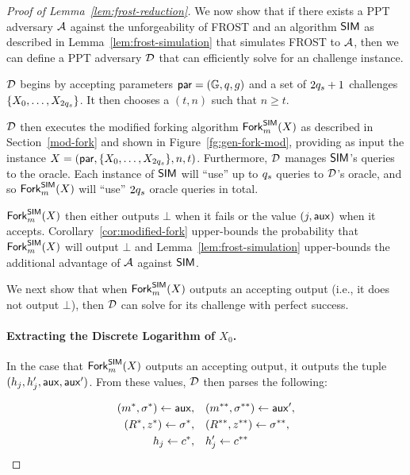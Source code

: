 \begin{proof}[Proof of Lemma~\ref{lem:frost-reduction}]
  We now show that if there exists a PPT adversary $\mathcal{A}$ against the
  unforgeability of FROST and an algorithm $\mathsf{SIM}$
  as described in Lemma~\ref{lem:frost-simulation} that simulates FROST to $\mathcal{A}$,
  then we can define a PPT adversary $\mathcal{D}$ that can efficiently solve for an \AOMDL challenge instance.

  $\mathcal{D}$ begins by accepting parameters $\mathsf{par} = (\mathbb{G}, q, g)$ and a set  of $2q_s+1$ \AOMDL challenges
  $\{ X_0, \ldots, X_{2q_s}\}$.
  It then chooses a $(t, n)$ such that $n \geq t$.

  $\mathcal{D}$ then executes the modified forking algorithm $\mathsf{Fork}_m^{\mathsf{SIM}}(X)$ as described in Section~\ref{mod-fork} and shown in Figure~\ref{fg:gen-fork-mod},
  providing as input the instance $X = (\mathsf{par}, \{ X_0, \ldots, X_{2q_s}\}, n, t)$.
  Furthermore, $\mathcal{D}$ manages $\mathsf{SIM}$'s queries to the \AOMDL oracle.
  Each instance of $\mathsf{SIM}$ will ``use'' up to $q_s$ queries to $\mathcal{D}$'s \AOMDL oracle,
  and so $\mathsf{Fork}_m^{\mathsf{SIM}}(X)$ will ``use'' $2q_s$ \AOMDL oracle queries in total.

  $\mathsf{Fork}_m^{\mathsf{SIM}}(X)$ then either outputs $\bot$ when it fails or the value $(j, \mathsf{aux})$ when it accepts.
  Corollary~\ref{cor:modified-fork} upper-bounds the probability that $\mathsf{Fork}_m^{\mathsf{SIM}}(X)$ will output $\bot$
  and Lemma~\ref{lem:frost-simulation} upper-bounds the additional advantage of $\mathcal{A}$ against $\mathsf{SIM}$.

   We next show that when $\mathsf{Fork}_m^{\mathsf{SIM}}(X)$ outputs an accepting output
   (i.e., it does not output $\bot$),
   then $\mathcal{D}$ can solve for its \AOMDL challenge with perfect success.

 \paragraph{Extracting the Discrete Logarithm of $X_0$.}
   In the case that $\mathsf{Fork}_m^{\mathsf{SIM}}(X)$ outputs an accepting output,
   it outputs the tuple $(h_j, h_j', \mathsf{aux}, \mathsf{aux}')$.
   From these values,
   $\mathcal{D}$ then parses the following:

   \begin{align*}
     \begin{split}
       (m^*, \sigma^*)  \gets \mathsf{aux},
       & \quad (m^{**}, \sigma^{**})  \gets \mathsf{aux}', \\
       (R^*, z^*)  \gets \sigma^*,
       & \quad (R^{**}, z^{**})  \gets \sigma^{**}, \\
       h_j \gets c^*, & \quad h_j' \gets c^{**}
     \end{split}
   \end{align*}


\end{proof}
